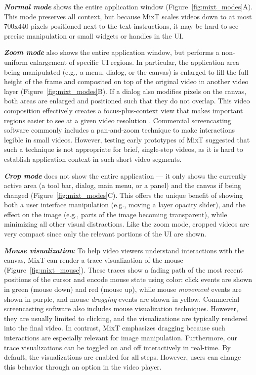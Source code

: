 \emph{\textbf{Normal mode}} shows the entire application window (Figure~\ref{fig:mixt_modes}A). This mode preserves all context, but because MixT scales videos down to at most 700x440 pixels positioned next to the text instructions, it may be hard to see precise manipulation or small widgets or handles in the UI.

\emph{\textbf{Zoom mode}} also shows the entire application window, but performs a non-uniform enlargement of specific UI regions. In particular, the application area being manipulated (e.g., a menu, dialog, or the canvas) is enlarged to fill the full height of the frame and composited on top of the original video in another video layer (Figure~\ref{fig:mixt_modes}B). If a dialog also modifies pixels on the canvas, both areas are enlarged and positioned such that they do not overlap. This video composition effectively creates a focus-plus-context view that makes important regions easier to see at a given video resolution \cite{Furnas:1986:GFV:22627.22342}. Commercial screencasting software commonly includes a pan-and-zoom technique to make interactions legible in small videos. However, testing early prototypes of MixT suggested that such a technique is not appropriate for brief, single-step videos, as it is hard to establish application context in such short video segments.

\emph{\textbf{Crop mode}} does not show the entire application — it only shows the currently active area (a tool bar, dialog, main menu, or a panel) and the canvas if being changed (Figure~\ref{fig:mixt_modes}C). This offers the unique benefit of showing both a user interface manipulation (e.g., moving a layer opacity slider), and the effect on the image (e.g., parts of the image becoming transparent), while minimizing all other visual distractions. Like the zoom mode, cropped videos are very compact since only the relevant portions of the UI are shown.

\emph{\textbf{Mouse visualization}}: To help video viewers understand interactions with the canvas, MixT can render a trace visualization of the mouse (Figure~\ref{fig:mixt_mouse}). These traces show a fading path of the most recent positions of the cursor and encode mouse state using color: click events are shown in green (mouse down) and red (mouse up), while mouse \emph{movement} events are shown in purple, and mouse \emph{dragging} events are shown in yellow. Commercial screencasting software also includes mouse visualization techniques. However, they are usually limited to clicking, and the visualizations are typically rendered into the final video. In contrast, MixT emphasizes dragging because such interactions are especially relevant for image manipulation. Furthermore, our trace visualizations can be toggled on and off interactively in real-time. By default, the visualizations are enabled for all steps. However, users can change this behavior through an option in the video player.

